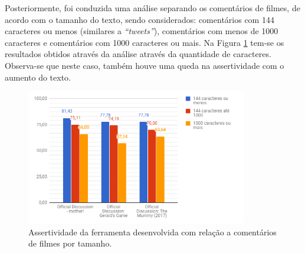 Posteriormente, foi conduzida uma análise separando
os comentários de filmes, de acordo com o tamanho do texto, sendo considerados:
comentários com 144 caracteres ou menos (similares a \textit{``tweets''}), comentários com menos de 1000 caracteres e comentários com
1000 caracteres ou mais. Na Figura \ref{fig:fil2} tem-se os resultados obtidos através da
análise através da quantidade de caracteres. Observa-se que neste caso, também
houve uma queda na assertividade com o aumento do texto.

\begin{figure}[!htbp]
\centering
\includegraphics[height=225px]{imagens/filmes2.png}
\caption{Assertividade da ferramenta desenvolvida com relação a comentários de
filmes por tamanho.}
\label{fig:fil2}
\end{figure}
